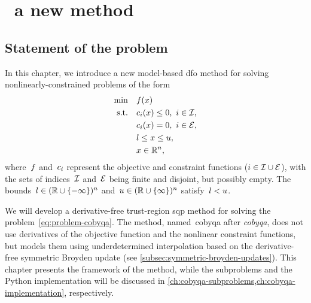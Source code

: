 %
%
%
\chapter{ \textemdash\ a new  method}
\label{ch:cobyqa-introduction}

\section{Statement of the problem}

In this chapter, we introduce a new model-based \gls{dfo} method for solving nonlinearly-constrained problems of the form
\begin{subequations}
    \label{eq:problem-cobyqa}
    \begin{align}
        \min        & \quad \obj(\iter)\\
        \text{s.t.} & \quad \con{i}(\iter) \le 0, ~ i \in \iub, \label{eq:problem-cobyqa-ub}\\
                    & \quad \con{i}(\iter) = 0, ~ i \in \ieq,\\
                    & \quad \xl \le x \le \xu, \label{eq:problem-cobyqa-bd}\\
                    & \quad \iter \in \R^n, \nonumber
    \end{align}
\end{subequations}
where~$f$ and~$c_{i}$ represent the objective and constraint functions ($i \in \mathcal{I} \cup \mathcal{E}$), with the sets of indices~$\mathcal{I}$ and~$\mathcal{E}$ being finite and disjoint, but possibly empty. 
The bounds~$l \in (\mathbb{R} \cup \{-\infty\})^n$ and~$u \in (\mathbb{R} \cup \{\infty\})^n$ satisfy~$l < u$.

We will develop a derivative-free trust-region \gls{sqp} method for solving the problem~\cref{eq:problem-cobyqa}.
The method, named~\gls{cobyqa} after \emph{\glsdesc{cobyqa}}, does not use derivatives of the objective function and the nonlinear constraint functions, but models them using underdetermined interpolation based on the derivative-free symmetric Broyden update (see \cref{subsec:symmetric-broyden-updates}).
This chapter presents the framework of the method, while the subproblems and the Python implementation will be discussed in \cref{ch:cobyqa-subproblems,ch:cobyqa-implementation}, respectively.

